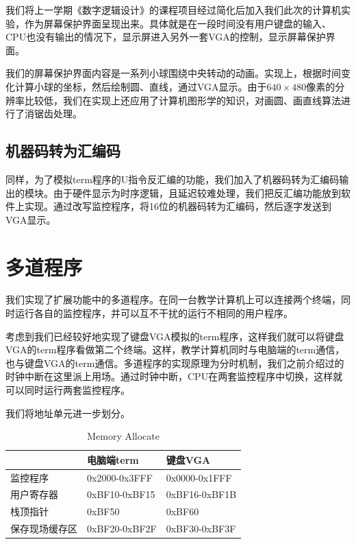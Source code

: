 我们将上一学期《数字逻辑设计》的课程项目经过简化后加入我们此次的计算机实验，作为屏幕保护界面呈现出来。具体就是在一段时间没有用户键盘的输入、CPU也没有输出的情况下，显示屏进入另外一套VGA的控制，显示屏幕保护界面。

我们的屏幕保护界面内容是一系列小球围绕中央转动的动画。实现上，根据时间变化计算小球的坐标，然后绘制圆、直线，通过VGA显示。由于$640\times 480$像素的分辨率比较低，我们在实现上还应用了计算机图形学的知识，对画圆、画直线算法进行了消锯齿处理。

\subsection{机器码转为汇编码}

同样，为了模拟term程序的U指令反汇编的功能，我们加入了机器码转为汇编码输出的模块。由于硬件显示为时序逻辑，且延迟较难处理，我们把反汇编功能放到软件上实现。通过改写监控程序，将16位的机器码转为汇编码，然后逐字发送到VGA显示。



\section{多道程序}

我们实现了扩展功能中的多道程序。在同一台教学计算机上可以连接两个终端，同时运行各自的监控程序，并可以互不干扰的运行不相同的用户程序。

考虑到我们已经较好地实现了键盘VGA模拟的term程序，这样我们就可以将键盘VGA的term程序看做第二个终端。这样，教学计算机同时与电脑端的term通信，也与键盘VGA的term通信。多道程序的实现原理为分时机制，我们之前介绍过的时钟中断在这里派上用场。通过时钟中断，CPU在两套监控程序中切换，这样就可以同时运行两套监控程序。

我们将地址单元进一步划分。

\begin{table}[H]
\begin{center}
\renewcommand{\arraystretch}{1.3}
\small
\caption{Memory Allocate}
\label{tab:treatments}
\begin{tabular}{|p{3cm}<{\centering}|p{3.5cm}<{\centering}|p{3.5cm}<{\centering}|}
\hline
 & 电脑端term & 键盘VGA \\
\hline
监控程序 & 0x2000-0x3FFF & 0x0000-0x1FFF \\
\hline
用户寄存器 & 0xBF10-0xBF15 & 0xBF16-0xBF1B \\
\hline
栈顶指针 & 0xBF50 & 0xBF60 \\
\hline
保存现场缓存区 & 0xBF20-0xBF2F & 0xBF30-0xBF3F \\
\hline
\end{tabular}
\end{center}
\end{table}

